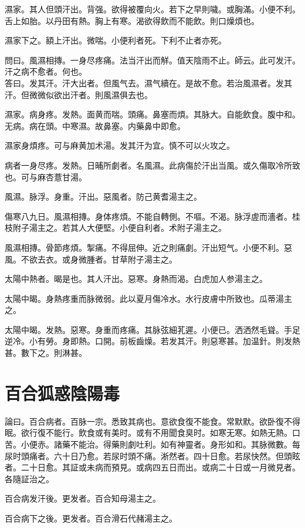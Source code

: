 \documentclass[12pt,twoside,UTF8,b5paper]{ctexbook}
\begin{document}
濕家。其人但頭汗出。背强。欲得被覆向火。若下之早則噦。或胸滿。小便{不}利。舌上如胎。以丹田有熱。胸上有寒。渴欲得飲而不能飲。則口燥{煩}也。

濕家下之。額上汗出。微喘。小便利者死。下利不止者亦死。

問曰。風濕相摶。一身尽疼痛。法当汗出而觧。值天陰雨不止。師云。此可发汗。汗之病不愈者。何也。\\
答曰。发其汗。汗大出者。但風气去。濕气續在。是故不愈。若治風濕者。发其汗。但微微似欲出汗者。則風濕俱去也。

濕家。病身疼。发熱。面黄而喘。頭痛。鼻塞而煩。其脉大。自能飲食。腹中和。无病。病在頭。中寒濕。故鼻塞。内藥鼻中即愈。

濕家身煩疼。可与麻黄加术湯。发其汗为宜。慎不可以火攻之。

病者一身尽疼。发熱。日晡所劇者。名風濕。此病傷於汗出当風。或久傷取冷所致也。可与麻杏薏甘湯。

風濕。脉浮。身重。汗出。惡風者。防己黄耆湯主之。

傷寒八九日。風濕相摶。身体疼煩。不能自轉側。不嘔。不渴。脉浮虗而濇者。桂枝附子湯主之。若其人大便堅。小便自利者。术附子湯主之。

風濕相摶。骨節疼煩。掣痛。不得屈伸。近之則痛劇。汗出短气。小便不利。惡風。不欲去衣。或身微腫者。甘草附子湯主之。

太陽中熱者。暍是也。其人汗出。惡寒。身熱而渴。白虎{加人参}湯主之。

太陽中暍。身熱疼重而脉微弱。此以夏月傷冷水。水行皮膚中所致也。瓜蒂湯主之。

太陽中暍。发熱。惡寒。身重而疼痛。其脉弦細芤遲。小便已。洒洒然毛聳。手足逆冷。小有勞。身即熱。口開。前板齒燥。若发其汗。則惡寒甚。加温針。則发熱甚。數下之。則淋甚。

\chapter{百合狐惑陰陽毒}

論曰。百合病者。百脉一宗。悉致其病也。意欲食復不能食。常默默。欲卧復不得眠。欲行復不能行。飲食或有美时。或有不用聞食臭时。如寒无寒。如熱无熱。口苦。小便赤。諸藥不能治。得藥則劇吐利。如有神靈者。身形如和。其脉微數。每尿时頭痛者。六十日乃愈。若尿时頭不痛。淅然者。四十日愈。若尿快然。但頭眩者。二十日愈。其証或未病而預見。或病四五日而出。或病二十日或一月微見者。各隨証治之。

百合病发汗後。更发者。百合知母湯主之。

百合病下之後。更发者。百合滑石代赭湯主之。
\end{document}
